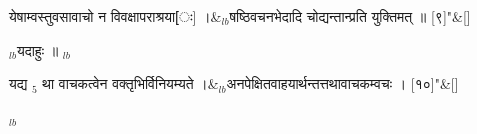 \documentclass[article,12pt,a4paper]{memoir}%
\newcounter{parCount}
\begin{document}
	    
	    \stanza[\smallbreak]
	  येषाम्वस्तुवसावाचो न विवक्षापराश्रया[ः] ।&{\tiny $_{lb}$}\leavevmode{}षष्ठिवचनभेदादि चोद्यन्तान्प्रति युक्तिमत् ॥ [९]{\normalfontlatin\large\qquad{}"}\&[\smallbreak]
	  
	  
	  
	    \pstart  \leavevmode%
	    \hphantom{.}
	   {\tiny $_{lb}$}यदाहुः ॥
	{}
	\pend%
      {\tiny $_{lb}$}
	  \bigskip
	  \begingroup
	
	    
	    \stanza[\smallbreak]
	  यद्य {\tiny $_{5}$} था वाचकत्वेन वक्तृभिर्विनियम्यते ।&{\tiny $_{lb}$}अनपेक्षितवाहयार्थन्तत्तथावाचकम्वचः । [१०]{\normalfontlatin\large\qquad{}"}\&[\smallbreak]
	  
	  
	  
	  \endgroup
	{\tiny $_{lb}$}
\end{document}
